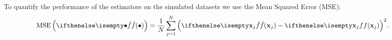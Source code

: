 To quantify the performance of the estimators on the simulated datasets we use the Mean Squared Error (MSE):
\begin{equation*}
	\varMSE{\varEstimatedDensityFunction{\bullet}} = \frac{1}{\varNumPatterns} \sum_{\itXs = 1}^{\varNumPatterns} {\left(\varEstimatedDensityFunction{\varPattern[\itXs]} - \varDensityFunction{\varPattern[\itXs]} \right)}^2.
\end{equation*}
